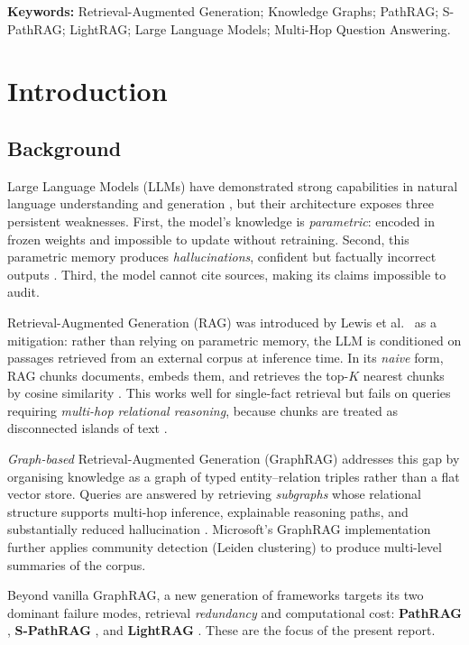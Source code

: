 \documentclass[12pt,a4paper,oneside]{report}
\begin{document}
\vspace{1em}
\noindent\textbf{Keywords:} Retrieval-Augmented Generation; Knowledge Graphs;
PathRAG; S-PathRAG; LightRAG; Large Language Models; Multi-Hop Question
Answering.

\chapter{Introduction}
\label{ch:introduction}

\section{Background}

Large Language Models (LLMs) have demonstrated strong capabilities in natural
language understanding and generation \citep{yang2024}, but their architecture
exposes three persistent weaknesses. First, the model's knowledge is
\emph{parametric}: encoded in frozen weights and impossible to update without
retraining. Second, this parametric memory produces \emph{hallucinations},
confident but factually incorrect outputs \citep{tonmoy2024}. Third, the model
cannot cite sources, making its claims impossible to audit.

Retrieval-Augmented Generation (RAG) was introduced by Lewis et al.~\citep{lewis2020} as a
mitigation: rather than relying on parametric memory, the LLM is conditioned
on passages retrieved from an external corpus at inference time. In its
\emph{naive} form, RAG chunks documents, embeds them, and retrieves the
top-$K$ nearest chunks by cosine similarity \citep{gao2023,fan2024}. This
works well for single-fact retrieval but fails on queries requiring
\emph{multi-hop relational reasoning}, because chunks are treated as
disconnected islands of text \citep{han2025,edge2024}.

\emph{Graph-based} Retrieval-Augmented Generation (GraphRAG) addresses this
gap by organising knowledge as a graph of typed entity--relation triples
rather than a flat vector store. Queries are answered by retrieving
\emph{subgraphs} whose relational structure supports multi-hop inference,
explainable reasoning paths, and substantially reduced hallucination
\citep{han2025,peng2024,msresearch2024}. Microsoft's GraphRAG
implementation \citep{edge2024} further applies community detection
(Leiden clustering) to produce multi-level summaries of the corpus.

Beyond vanilla GraphRAG, a new generation of frameworks targets its two
dominant failure modes, retrieval \emph{redundancy} and computational
cost: \textbf{PathRAG} \citep{chen2025pathrag}, \textbf{S-PathRAG}
\citep{fu2026spathrag}, and \textbf{LightRAG} \citep{guo2025lightrag}. These
are the focus of the present report.
\end{document}
